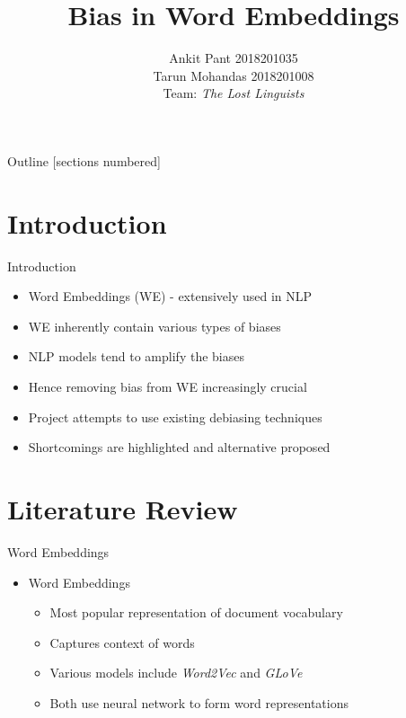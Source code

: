\documentclass{beamer}
\title{\centering Bias in Word Embeddings \\ \vspace{-5mm}}
\author{
	Ankit Pant 2018201035 \\ 
	Tarun Mohandas 2018201008 \\
	Team: \textit{The Lost Linguists}
}
\date{}
\begin{document}
	\begin{frame}[plain]
		\maketitle
	\end{frame}
	\begin{frame}{Outline}
		[sections numbered]
		\tableofcontents
	\end{frame}
	
	\section{Introduction}
		\begin{frame}{Introduction}
			\begin{itemize}
				\item Word Embeddings (WE) - extensively used in NLP
				\item WE inherently contain various types of biases
				\item NLP models tend to amplify the biases
				\item Hence removing bias from WE increasingly crucial
				\item Project attempts to use existing debiasing techniques
				\item Shortcomings are highlighted and alternative proposed
			\end{itemize}
		\end{frame}
	
	\section{Literature Review}
		\begin{frame}{Word Embeddings}
			\begin{itemize}
				\item Word Embeddings
				\begin{itemize}
					\item Most popular representation of document vocabulary
					\item Captures context of words
					\item Various models include \emph{Word2Vec} and \emph{GLoVe}
					\item Both use neural network to form word representations
				\end{itemize}
			\end{itemize}
		\end{frame}
\end{document}
